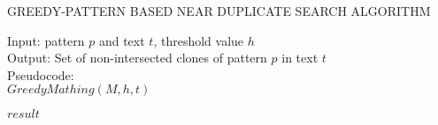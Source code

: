 \begin{algorithm}[H]
\caption{GREEDY-PATTERN BASED NEAR DUPLICATE
SEARCH ALGORITHM}
\label{alg:appximateMatchingGreedy}
Input: pattern $p$ and text $t$, threshold value $h$\\
Output: Set of non-intersected clones of pattern $p$ in text $t$\\
Pseudocode:\\
$GreedyMathing(M,h,t)$
\begin{algorithmic}[1]

\RETURN $result$
\end{algorithmic}
\end{algorithm}


